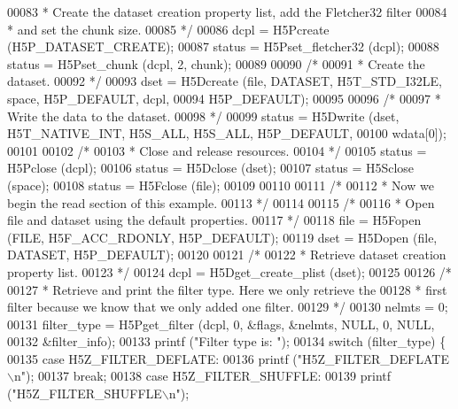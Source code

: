 \begin{DoxyCode}
00083 \textcolor{comment}{     * Create the dataset creation property list, add the Fletcher32 filter}
00084 \textcolor{comment}{     * and set the chunk size.}
00085 \textcolor{comment}{     */}
00086     dcpl = H5Pcreate (H5P\_DATASET\_CREATE);
00087     status = H5Pset\_fletcher32 (dcpl);
00088     status = H5Pset\_chunk (dcpl, 2, chunk);
00089 
00090     \textcolor{comment}{/*}
00091 \textcolor{comment}{     * Create the dataset.}
00092 \textcolor{comment}{     */}
00093     dset = H5Dcreate (file, DATASET, H5T\_STD\_I32LE, space, H5P\_DEFAULT, dcpl,
00094                 H5P\_DEFAULT);
00095 
00096     \textcolor{comment}{/*}
00097 \textcolor{comment}{     * Write the data to the dataset.}
00098 \textcolor{comment}{     */}
00099     status = H5Dwrite (dset, H5T\_NATIVE\_INT, H5S\_ALL, H5S\_ALL, H5P\_DEFAULT,
00100                 wdata[0]);
00101 
00102     \textcolor{comment}{/*}
00103 \textcolor{comment}{     * Close and release resources.}
00104 \textcolor{comment}{     */}
00105     status = H5Pclose (dcpl);
00106     status = H5Dclose (dset);
00107     status = H5Sclose (space);
00108     status = H5Fclose (file);
00109 
00110 
00111     \textcolor{comment}{/*}
00112 \textcolor{comment}{     * Now we begin the read section of this example.}
00113 \textcolor{comment}{     */}
00114 
00115     \textcolor{comment}{/*}
00116 \textcolor{comment}{     * Open file and dataset using the default properties.}
00117 \textcolor{comment}{     */}
00118     file = H5Fopen (FILE, H5F\_ACC\_RDONLY, H5P\_DEFAULT);
00119     dset = H5Dopen (file, DATASET, H5P\_DEFAULT);
00120 
00121     \textcolor{comment}{/*}
00122 \textcolor{comment}{     * Retrieve dataset creation property list.}
00123 \textcolor{comment}{     */}
00124     dcpl = H5Dget\_create\_plist (dset);
00125 
00126     \textcolor{comment}{/*}
00127 \textcolor{comment}{     * Retrieve and print the filter type.  Here we only retrieve the}
00128 \textcolor{comment}{     * first filter because we know that we only added one filter.}
00129 \textcolor{comment}{     */}
00130     nelmts = 0;
00131     filter\_type = H5Pget\_filter (dcpl, 0, &flags, &nelmts, NULL, 0, NULL,
00132                 &filter\_info);
00133     printf (\textcolor{stringliteral}{"Filter type is: "});
00134     \textcolor{keywordflow}{switch} (filter\_type) \{
00135         \textcolor{keywordflow}{case} H5Z\_FILTER\_DEFLATE:
00136             printf (\textcolor{stringliteral}{"H5Z\_FILTER\_DEFLATE\(\backslash\)n"});
00137             \textcolor{keywordflow}{break};
00138         \textcolor{keywordflow}{case} H5Z\_FILTER\_SHUFFLE:
00139             printf (\textcolor{stringliteral}{"H5Z\_FILTER\_SHUFFLE\(\backslash\)n"});

\end{DoxyCode}
